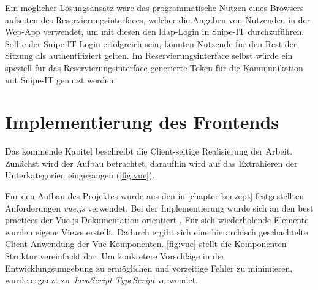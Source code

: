 Ein möglicher Lösungsansatz wäre das programmatische Nutzen eines Browsers aufseiten des
Reservierungsinterfaces, welcher die Angaben von Nutzenden in der Wep-App verwendet, um mit diesen
den \ac{ldap}-Login in Snipe-IT durchzuführen. Sollte der Snipe-IT Login erfolgreich sein, könnten
Nutzende für den Rest der Sitzung als authentifiziert gelten. Im Reservierungsinterface selbst
würde ein speziell für das Reservierungsinterface generierte Token für die Kommunikation mit
Snipe-IT genutzt werden.

\section{Implementierung des Frontends}
\label{subsec:frontend}
Das kommende Kapitel beschreibt die Client-seitige Realisierung der Arbeit. Zunächst wird der Aufbau
betrachtet, daraufhin wird auf das Extrahieren der Unterkategorien eingegangen (\ref{fig:vue}).


Für den Aufbau des Projektes wurde aus den in \ref{chapter-konzept} festgestellten Anforderungen
\textit{vue.js} verwendet. Bei der Implementierung wurde sich an den best practices der
Vue.js-Dokumentation orientiert . Für sich wiederholende Elemente wurden
eigene Views erstellt. Dadurch ergibt sich eine hierarchisch geschachtelte Client-Anwendung der
Vue-Komponenten. \ref{fig:vue} stellt die Komponenten-Struktur vereinfacht dar. Um
konkretere Vorschläge in der Entwicklungsumgebung zu ermöglichen und vorzeitige Fehler zu
minimieren, wurde ergänzt zu \textit{JavaScript} \textit{TypeScript} verwendet.

